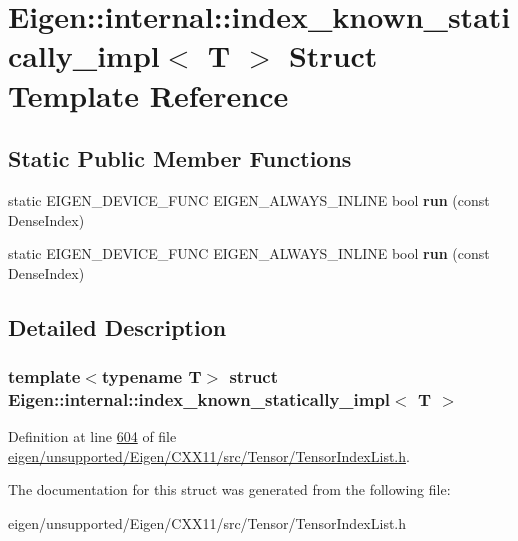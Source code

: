 \hypertarget{struct_eigen_1_1internal_1_1index__known__statically__impl}{}\section{Eigen\+:\+:internal\+:\+:index\+\_\+known\+\_\+statically\+\_\+impl$<$ T $>$ Struct Template Reference}
\label{struct_eigen_1_1internal_1_1index__known__statically__impl}
\subsection*{Static Public Member Functions}
\begin{DoxyCompactItemize}
\item 
\mbox{\label{struct_eigen_1_1internal_1_1index__known__statically__impl_a6a088a32afeb421692058b7407448de4}} 
static E\+I\+G\+E\+N\+\_\+\+D\+E\+V\+I\+C\+E\+\_\+\+F\+U\+NC E\+I\+G\+E\+N\+\_\+\+A\+L\+W\+A\+Y\+S\+\_\+\+I\+N\+L\+I\+NE bool {\bfseries run} (const Dense\+Index)
\item 
\mbox{\label{struct_eigen_1_1internal_1_1index__known__statically__impl_a6a088a32afeb421692058b7407448de4}} 
static E\+I\+G\+E\+N\+\_\+\+D\+E\+V\+I\+C\+E\+\_\+\+F\+U\+NC E\+I\+G\+E\+N\+\_\+\+A\+L\+W\+A\+Y\+S\+\_\+\+I\+N\+L\+I\+NE bool {\bfseries run} (const Dense\+Index)
\end{DoxyCompactItemize}


\subsection{Detailed Description}
\subsubsection*{template$<$typename T$>$\newline
struct Eigen\+::internal\+::index\+\_\+known\+\_\+statically\+\_\+impl$<$ T $>$}



Definition at line \hyperlink{eigen_2unsupported_2_eigen_2_c_x_x11_2src_2_tensor_2_tensor_index_list_8h_source_l00604}{604} of file \hyperlink{eigen_2unsupported_2_eigen_2_c_x_x11_2src_2_tensor_2_tensor_index_list_8h_source}{eigen/unsupported/\+Eigen/\+C\+X\+X11/src/\+Tensor/\+Tensor\+Index\+List.\+h}.



The documentation for this struct was generated from the following file\+:\begin{DoxyCompactItemize}
\item 
eigen/unsupported/\+Eigen/\+C\+X\+X11/src/\+Tensor/\+Tensor\+Index\+List.\+h\end{DoxyCompactItemize}
